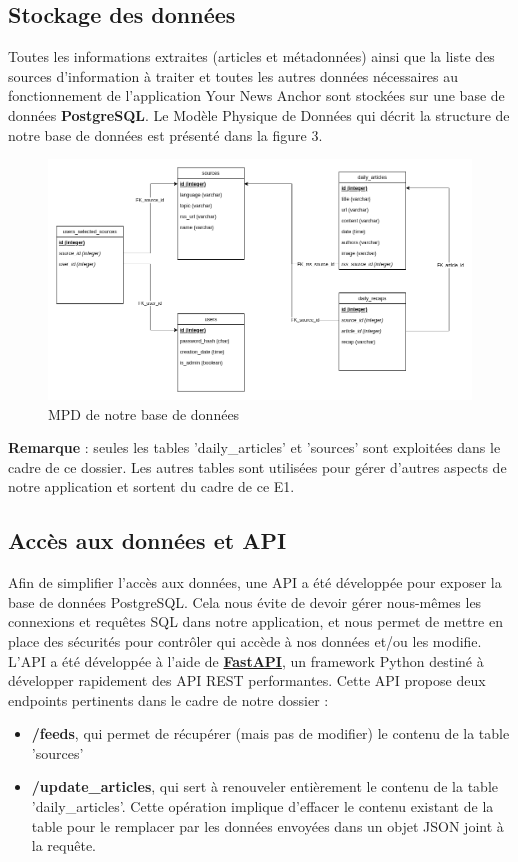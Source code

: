 \documentclass[french]{article}
\begin{document}
    \subsection{Stockage des données}

    Toutes les informations extraites (articles et métadonnées) ainsi que la liste des sources d'information à traiter et toutes les autres données nécessaires au fonctionnement de l'application Your News Anchor sont stockées sur une base de données \textbf{PostgreSQL}. Le Modèle Physique de Données qui décrit la structure de notre base de données est présenté dans la figure 3.

    \begin{figure}[h]
        \includegraphics[width=12cm]{mpd_e1}
        \centering
        \caption{MPD de notre base de données}
        \centering
    \end{figure}

    \textbf{Remarque} : seules les tables 'daily\_articles' et 'sources' sont exploitées dans le cadre de ce dossier. Les autres tables sont utilisées pour gérer d'autres aspects de notre application et sortent du cadre de ce E1.

    \subsection{Accès aux données et API}
    
    Afin de simplifier l'accès aux données, une API a été développée pour exposer la base de données PostgreSQL. Cela nous évite de devoir gérer nous-mêmes les connexions et requêtes SQL dans notre application, et nous permet de mettre en place des sécurités pour contrôler qui accède à nos données et/ou les modifie.
    L'API a été développée à l'aide de \textbf{\href{https://fastapi.tiangolo.com/}{FastAPI}}, un framework Python destiné à développer rapidement des API REST performantes. Cette API propose deux endpoints pertinents dans le cadre de notre dossier :
    \begin{itemize}
        \item \textbf{/feeds}, qui permet de récupérer (mais pas de modifier) le contenu de la table 'sources'
        \item \textbf{/update\_articles}, qui sert à renouveler entièrement le contenu de la table 'daily\_articles'. Cette opération implique d'effacer le contenu existant de la table pour le remplacer par les données envoyées dans un objet JSON joint à la requête.
    \end{itemize}
\end{document}

